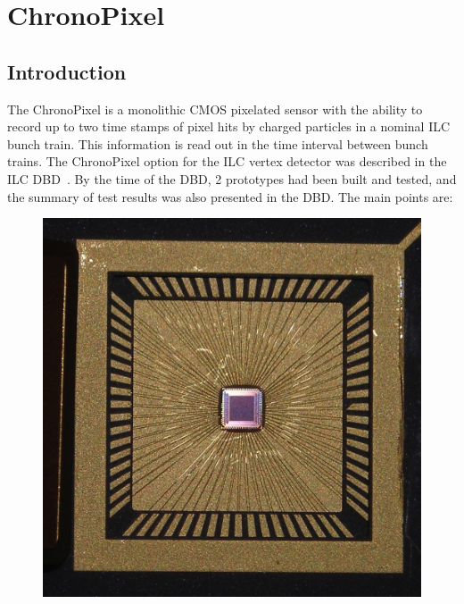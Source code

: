 \section{ChronoPixel}

\subsection{Introduction}
The ChronoPixel is a monolithic CMOS pixelated sensor with the ability to record up to two time stamps of pixel hits by charged particles in a nominal ILC bunch train. This information is read out in the time interval between bunch trains. The ChronoPixel option for the ILC vertex detector was described in the ILC DBD~\cite{2011arXiv1109.2811B}. By the time of the DBD, 2 prototypes had been built and tested, and the summary of test results was also presented in the DBD. The main points are:
\begin{figure}
    \includegraphics[width=.5\linewidth]{VertexDetector/Chronopix/Chronopix_image}
\end{figure}
